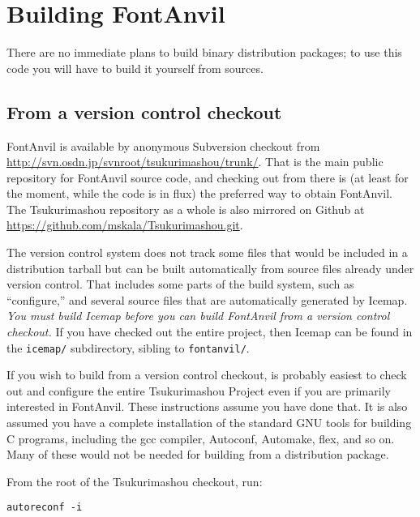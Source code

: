 
\chapter{Building FontAnvil}

There are no immediate plans to build binary distribution packages; to use
this code you will have to build it yourself from sources.

\section{From a version control checkout}

FontAnvil is available by anonymous Subversion checkout from
\url{http://svn.osdn.jp/svnroot/tsukurimashou/trunk/}. 
That is the main public repository for FontAnvil source code, and checking
out from there is (at least for the moment, while the code is in flux) the
preferred way to obtain FontAnvil.  The Tsukurimashou repository as a whole
is also mirrored on Github at
\url{https://github.com/mskala/Tsukurimashou.git}.

The version control system does not track some files that would be included
in a distribution tarball but can be built automatically from source files
already under version control.  That includes some parts of the build
system, such as ``configure,'' and several source files that are
automatically generated by Icemap.  \emph{You must build Icemap
before you can build FontAnvil from a version control checkout.} If you have
checked out the entire project, then Icemap can be found in
the \texttt{icemap/} subdirectory, sibling to \texttt{fontanvil/}.

If you wish to build from a version control checkout, is probably easiest to
check out and configure the entire Tsukurimashou Project even if you are
primarily interested in FontAnvil.  These instructions assume you have done
that.  It is also assumed you have a complete installation of the standard
GNU tools for building C programs, including the gcc compiler, Autoconf,
Automake, flex, and so on.  Many of these would not be needed for building
from a distribution package.

From the root of the Tsukurimashou checkout, run:
\begin{verbatim}
autoreconf -i
\end{verbatim}

